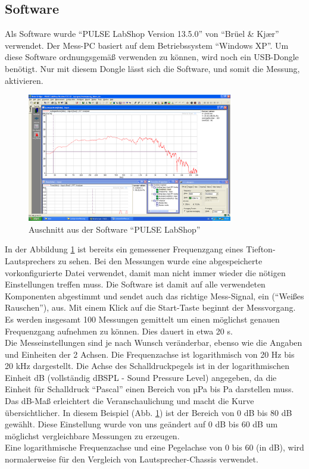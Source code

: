 \subsection*{Software}\label{subsec:4.1.1}
Als Software wurde \enquote{PULSE LabShop Version 13.5.0} von \enquote{Brüel \& Kj\ae r} verwendet.
Der Mess-PC basiert auf dem Betriebssystem \enquote{Windows XP}.
Um diese Software ordnungsgemäß verwenden zu können, wird noch ein USB-Dongle benötigt.
Nur mit diesem Dongle lässt sich die Software, und somit die Messung, aktivieren.
\begin{figure} [H]
	\centering
	\includegraphics[width=0.8\textwidth]{img/LSMessung/VisatonMitSilikonMitWolle.png}
	\caption{Auschnitt aus der Software \enquote{PULSE LabShop}}
	\label{fig:4.1.1.1}
\end{figure}
In der Abbildung \ref{fig:4.1.1.1} ist bereits ein gemessener Frequenzgang eines Tiefton-Lautsprechers zu sehen.
Bei den Messungen wurde eine abgespeicherte vorkonfigurierte Datei verwendet, damit man nicht immer wieder die nötigen Einstellungen treffen muss.
Die Software ist damit auf alle verwendeten Komponenten abgestimmt und sendet auch das richtige Mess-Signal, ein (\enquote{Weißes Rauschen}), aus.
Mit einem Klick auf die Start-Taste beginnt der Messvorgang.
Es werden insgesamt 100 Messungen gemittelt um einen möglichst genauen Frequenzgang aufnehmen zu können.
Dies dauert in etwa 20 s.
\\
Die Messeinstellungen sind je nach Wunsch veränderbar, ebenso wie die Angaben und Einheiten der 2 Achsen.
Die Frequenzachse ist logarithmisch von 20 Hz bis 20 kHz dargestellt.
Die Achse des Schalldruckpegels ist in der logarithmischen Einheit dB (vollständig dBSPL - Sound Pressure Level) angegeben, da die Einheit für Schalldruck \enquote{Pascal} einen Bereich von µPa bis Pa darstellen muss.
Das dB-Maß erleichtert die Veranschaulichung und macht die Kurve übersichtlicher.
In diesem Beispiel (Abb. \ref{fig:4.1.1.1}) ist der Bereich von 0 dB bis 80 dB gewählt.
Diese Einstellung wurde von uns geändert auf 0 dB bis 60 dB um möglichst vergleichbare Messungen zu erzeugen.\\
Eine logarithmische Frequenzachse und eine Pegelachse von 0 bis 60 (in dB), wird normalerweise für den Vergleich von Lautsprecher-Chassis verwendet.

